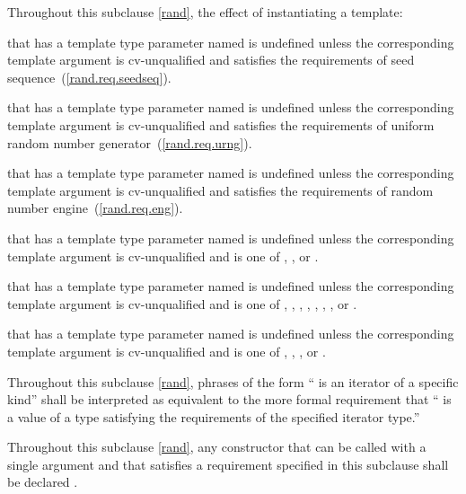 \pnum
Throughout this subclause \ref{rand},
the effect of instantiating a template:
\begin{enumeratea}
  \item
    that has a template type parameter
    named 
    is undefined unless the corresponding template argument
    is cv-unqualified and
    satisfies the requirements
    of seed sequence~(\ref{rand.req.seedseq}).
  \item
    that has a template type parameter
    named 
    is undefined unless the corresponding template argument
    is cv-unqualified and
    satisfies the requirements
    of uniform random number generator~(\ref{rand.req.urng}).
  \item
    that has a template type parameter
    named 
    is undefined unless the corresponding template argument
    is cv-unqualified and
    satisfies the requirements
    of random number engine~(\ref{rand.req.eng}).
  \item
    that has a template type parameter
    named 
    is undefined unless the corresponding template argument
    is cv-unqualified and
    is one of
    , , or  .
  \item
    that has a template type parameter
    named 
    is undefined unless the corresponding template argument
    is cv-unqualified and
    is one of
      ,
      ,
      ,
       ,
       ,
       ,
       ,
      or
        .
  \item
    that has a template type parameter
    named 
    is undefined unless the corresponding template argument
    is cv-unqualified and
    is one of
       ,
       ,
       ,
      or
        .
\end{enumeratea}

\pnum
Throughout this subclause \ref{rand},
phrases of the form `` is an iterator of a specific kind''
shall be interpreted as equivalent to the more formal requirement that
`` is a value
of a type satisfying the requirements
of the specified iterator type.''

\pnum
Throughout this subclause \ref{rand},
any constructor that can be called with a single argument
and that satisfies a requirement specified in this subclause
shall be declared .

